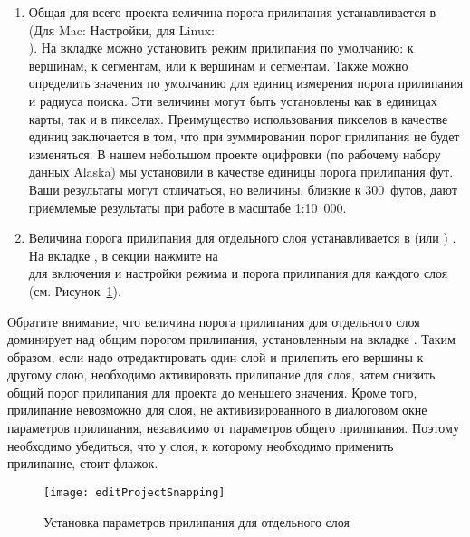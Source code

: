 \begin{enumerate}
\item Общая для всего проекта величина порога прилипания устанавливается в
 \arrow {}
(Для Mac: \mainmenuopt{\qg} \arrow Настройки, для Linux: 
\arrow \\ ).
На вкладке  можно установить режим прилипания по
умолчанию: к вершинам, к сегментам, или к вершинам и сегментам. Также можно определить
значения по умолчанию для единиц измерения порога прилипания и радиуса поиска.
Эти величины  могут быть установлены как в единицах карты, так и в пикселах.
Преимущество использования пикселов в качестве единиц заключается в том, что
при зуммировании порог прилипания не будет изменяться.
В нашем небольшом проекте оцифровки (по рабочему набору данных Alaska) мы
установили в качестве единицы порога прилипания фут. Ваши результаты могут
отличаться, но величины, близкие к 300~футов, дают приемлемые
результаты при работе в масштабе 1:10~000.
\item Величина порога прилипания для отдельного слоя устанавливается в
 (или ) \arrow
{}. На вкладке ,
в секции  нажмите на \\
 для
включения и настройки режима и порога прилипания для каждого слоя (см.
Рисунок~\ref{fig:snappingoptions}).
\end{enumerate}
Обратите внимание, что величина порога прилипания для отдельного слоя
доминирует над общим порогом прилипания, установленным на вкладке .
Таким образом, если надо отредактировать один слой и прилепить его вершины
к другому слою, необходимо активировать прилипание 
для слоя, затем снизить общий порог прилипания для проекта до меньшего
значения. Кроме того, прилипание невозможно для слоя, не активизированного
в диалоговом окне параметров прилипания, независимо от параметров
общего прилипания. Поэтому необходимо убедиться, что у слоя, к которому
необходимо применить прилипание, стоит флажок.

\begin{figure}[ht]
   \centering
   \texttt{[image: editProjectSnapping]}
   \caption{Установка параметров прилипания для отдельного слоя \wincaption}\label{fig:snappingoptions}
\end{figure}

